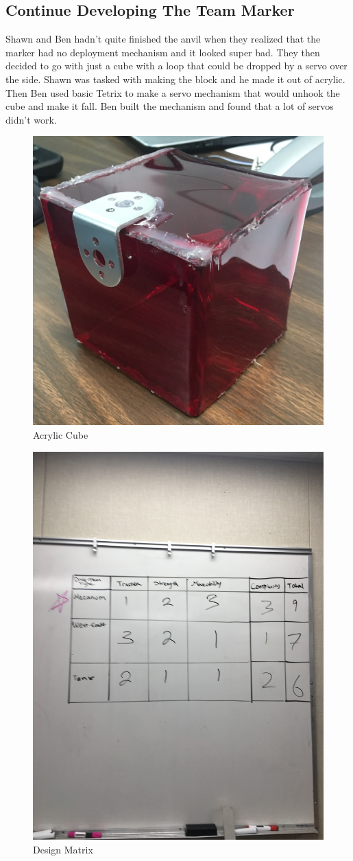 \documentclass{article}
\newif\ifcontents
\begin{document}
\contentsfalse


\subsection{Continue Developing The Team Marker}
Shawn and Ben hadn't quite finished the anvil when they realized that the marker had no deployment mechanism and it looked super bad. They then decided to go with just a cube with a loop that could be dropped by a servo over the side. Shawn was tasked with making the block and he made it out of acrylic. Then Ben used basic Tetrix to make a servo mechanism that would unhook the cube and make it fall. Ben built the mechanism and found that a lot of servos didn't work.

\begin{figure}
    \centering
    \includegraphics[width=.6\textwidth]{05_10-01/images/cube.jpg}
    \caption{Acrylic Cube}
    \label{fig:cube}
\end{figure}

\begin{figure}
    \centering
    \includegraphics[width=.5\textwidth]{05_10-01/images/Drive.JPG}
    \caption{Design Matrix}
    \label{fig:Metrix}
\end{figure}
\end{document}
